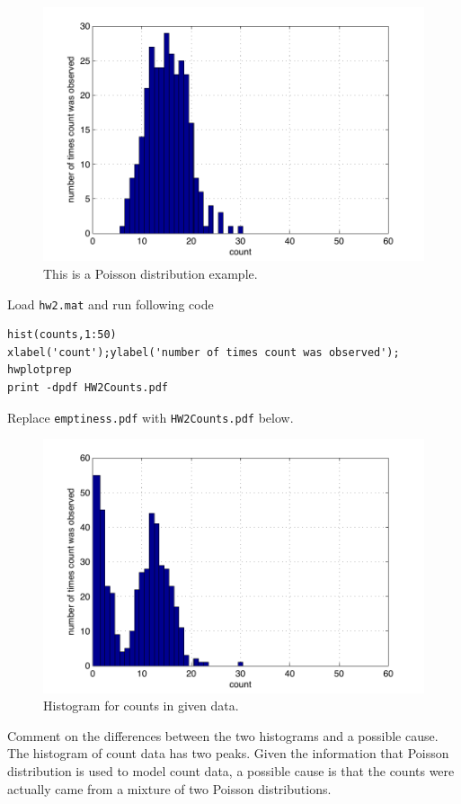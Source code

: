 \documentclass{article}
\begin{document}
{\begin{figure}[H]
\begin{center}
\includegraphics[scale=0.5]{aPoissonExample.pdf}
\caption{This is a Poisson distribution example.}
\end{center}
\end{figure}

Load \texttt{hw2.mat} and run following code
\begin{verbatim}
hist(counts,1:50)
xlabel('count');ylabel('number of times count was observed');
hwplotprep
print -dpdf HW2Counts.pdf
\end{verbatim}

Replace \texttt{emptiness.pdf} with \texttt{HW2Counts.pdf} below.

\begin{figure}[H]
\begin{center}
\includegraphics[scale=0.5]{HW2Counts.pdf}
\caption{Histogram for counts in given data.}
\end{center}
\end{figure}
Comment on the differences between the two histograms and a possible cause. The histogram of count data has two peaks. Given the information that Poisson distribution is used to model count data, a possible cause is that the counts were actually came from a mixture of two Poisson distributions.

}
\end{document}
